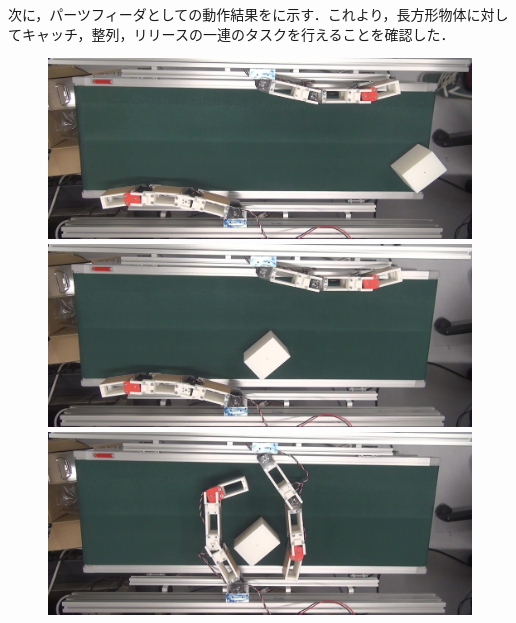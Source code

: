 \documentclass[a4paper,twoside,12pt,papersize, dvipdfmx]{iirthesis}
\begin{document}
次に，パーツフィーダとしての動作結果をに示す．これより，長方形物体に対してキャッチ，整列，リリースの一連のタスクを行えることを確認した．
\begin{figure}[hb]
\centering
\begin{minipage}{0.49\hsize}
\includegraphics[width=0.98\hsize]{fig/4-manipulation-result/Rectangle/3-1.jpg}
\subcaption{}
\end{minipage}\hfill
\begin{minipage}{0.49\hsize}
\includegraphics[width=0.98\hsize]{fig/4-manipulation-result/Rectangle/3-2.jpg}
\subcaption{}
\end{minipage}\hfill
\begin{minipage}{0.49\hsize}
\includegraphics[width=0.98\hsize]{fig/4-manipulation-result/Rectangle/3-3.jpg}
\subcaption{}
\end{minipage}\hfill
\begin{minipage}{0.49\hsize}

\end{minipage}
\end{figure}
\end{document}

